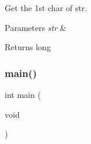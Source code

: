 Get the 1st char of str. 


\begin{DoxyParams}{Parameters}
{\em str} & \\
\hline
\end{DoxyParams}
\begin{DoxyReturn}{Returns}
long 
\end{DoxyReturn}
\mbox{\label{prueba_8c_ae66f6b31b5ad750f1fe042a706a4e3d4}} 
\subsubsection{main()}
{\footnotesize\ttfamily int main (\begin{DoxyParamCaption}\item[{void}]{ }\end{DoxyParamCaption})}

